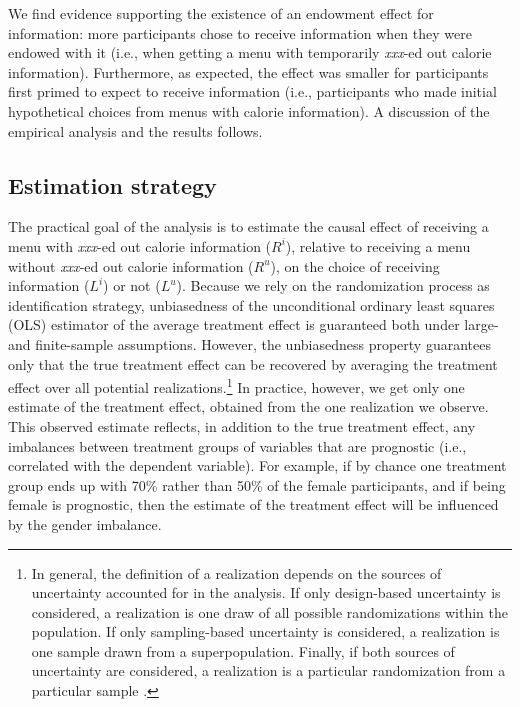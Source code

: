 
We find evidence supporting the existence of an endowment effect for information: more participants chose to receive information when they were endowed with it (i.e., when getting a menu with temporarily \emph{xxx}-ed out calorie information). Furthermore, as expected, the effect was smaller for participants first primed to expect to receive information (i.e., participants who made initial hypothetical choices from menus with calorie information). A discussion of the empirical analysis and the results follows.

\subsection{Estimation strategy}

The practical goal of the analysis is to estimate the causal effect of receiving a menu with \emph{xxx}-ed out calorie information ($R^i$), relative to receiving a menu without \emph{xxx}-ed out calorie information ($R^u$), on the choice of receiving information ($L^i$) or not ($L^u$). Because we rely on the randomization process as identification strategy, unbiasedness of the unconditional ordinary least squares (OLS) estimator of the average treatment effect is guaranteed both under large- and finite-sample assumptions. However, the unbiasedness property guarantees only that the true treatment effect can be recovered by averaging the treatment effect over all potential realizations.\footnote{In general, the definition of a realization depends on the sources of uncertainty accounted for in the analysis. If only design-based uncertainty is considered, a realization is one draw of all possible randomizations within the population. If only sampling-based uncertainty is considered, a realization is one sample drawn from a superpopulation. Finally, if both sources of uncertainty are considered, a realization is a particular randomization from a particular sample \citet{abadieSamplingBasedDesignBasedUncertainty2020}.} In practice, however, we get only one estimate of the treatment effect, obtained from the one realization we observe. This observed estimate reflects, in addition to the true treatment effect, any imbalances between treatment groups of variables that are prognostic (i.e., correlated with the dependent variable). For example, if by chance one treatment group ends up with 70\% rather than 50\% of the female participants, and if being female is prognostic, then the estimate of the treatment effect will be influenced by the gender imbalance.

